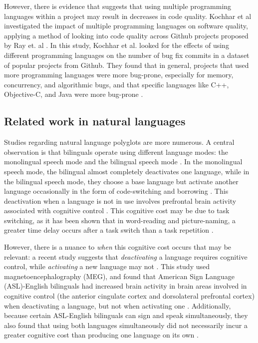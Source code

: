\documentclass[a4paper,UKenglish,cleveref, autoref]{oasics-v2019}
\begin{document}
However, there is evidence that suggests that using multiple programming languages within a project may result in decreases in code quality. Kochhar et al \cite{pl0025} investigated the impact of multiple programming languages on software quality, applying a method of looking into code quality across Github projects proposed by Ray et. al \cite{pl0026}. In this study, Kochhar et al. looked for the effects of using different programming languages on the number of bug fix commits in a dataset of popular projects from Github. They found that in general, projects that used more programming languages were more bug-prone, especially for memory, concurrency, and algorithmic bugs, and that specific languages like C++, Objective-C, and Java were more bug-prone \cite{pl0025}.

\subsection{Related work in natural languages}
Studies regarding natural language polyglots are more numerous. A central observation is that bilinguals operate using different language modes: the monolingual speech mode and the bilingual speech mode \cite{pl0046}. In the monolingual speech mode, the bilingual almost completely deactivates one language, while in the bilingual speech mode, they choose a base language but activate another language occasionally in the form of code-switching and borrowing \cite{pl0046}. This deactivation when a language is not in use involves prefrontal brain activity associated with cognitive control \cite{pl0048}. This cognitive cost may be due to task switching, as it has been shown that in word-reading and picture-naming, a greater time delay occurs after a task switch than a task repetition \cite{pl0031}. 

However, there is a nuance to \textit{when} this cognitive cost occurs that may be relevant: a recent study suggests that \textit{deactivating} a language requires cognitive control, while \textit{activating} a new language may not \cite{pl0029}. This study used magnetoencephalography (MEG), and found that American Sign Language (ASL)-English bilinguals had increased brain activity in brain areas involved in cognitive control (the anterior cingulate cortex and dorsolateral prefrontal cortex) when deactivating a language, but not when activating one \cite{pl0029}. Additionally, because certain ASL-English bilinguals can sign and speak simultaneously, they also found that using both languages simultaneously did not necessarily incur a greater cognitive cost than producing one language on its own \cite{pl0029}. 
\end{document}

